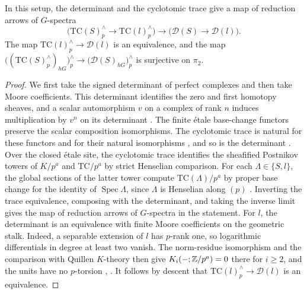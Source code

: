 \begin{lemma}\label{lem:second-two-determinant-comparison}
In this setup, the determinant and the cyclotomic trace give a map of reduction arrows of $G$-spectra
\[
 \bigl(\mathrm{TC}(S)^\wedge_p\to\mathrm{TC}(l)^\wedge_p\bigr)
 \longrightarrow\bigl(\mathcal D(S)\to\mathcal D(l)\bigr).
\]
The map $\mathrm{TC}(l)^\wedge_p\to\mathcal D(l)$ is an equivalence, and the map $\bigl((\mathrm{TC}(S)^\wedge_p)_{hG}\bigr)^\wedge_p\to\bigl(\mathcal D(S)_{hG}\bigr)^\wedge_p$ is surjective on $\pi_2$.
\end{lemma}
\begin{proof}
We first take the signed determinant of perfect complexes and then take Moore coefficients.
This determinant identifies the zero and first homotopy sheaves, and a scalar automorphism $v$ on a complex of rank $n$ induces multiplication by $v^n$ on its determinant \cite[Proposition 5.3 and \S12]{BhattScholzeWitt}.
The finite \'etale base-change functors preserve the scalar composition isomorphisms.
The cyclotomic trace is natural for these functors and for their natural isomorphisms \cite[Theorem 7.4]{BlumbergGepnerTabuada}, and so is the determinant \cite[Proposition 5.3]{BhattScholzeWitt}.
Over the closed \'etale site, the cyclotomic trace identifies the sheafified Postnikov towers of $K/p^a$ and $\mathrm{TC}/p^a$ by strict Henselian comparison.
For each $\Lambda\in\{S,l\}$, the global sections of the latter tower compute $\mathrm{TC}(\Lambda)/p^a$ by proper base change for the identity of $\operatorname{Spec}\Lambda$, since $\Lambda$ is Henselian along $(p)$ \cite[Theorems 6.1 and 6.3]{ClausenMathewMorrow}.
Inverting the trace equivalence, composing with the determinant, and taking the inverse limit gives the map of reduction arrows of $G$-spectra in the statement.
For $l$, the determinant is an equivalence with finite Moore coefficients on the geometric stalk.
Indeed, a separable extension of $l$ has $p$-rank one, so logarithmic differentials in degree at least two vanish.
The norm-residue isomorphism and the comparison with Quillen $K$-theory then give $K_i(-;\mathbb Z/p^a)=0$ there for $i\ge2$, and the units have no $p$-torsion \cite[Corollary (2.8)]{BlochKato1986}, \cite[Theorem 8.1]{GeisserLevine}.
It follows by descent that $\mathrm{TC}(l)^\wedge_p\to\mathcal D(l)$ is an equivalence.


\end{proof}

